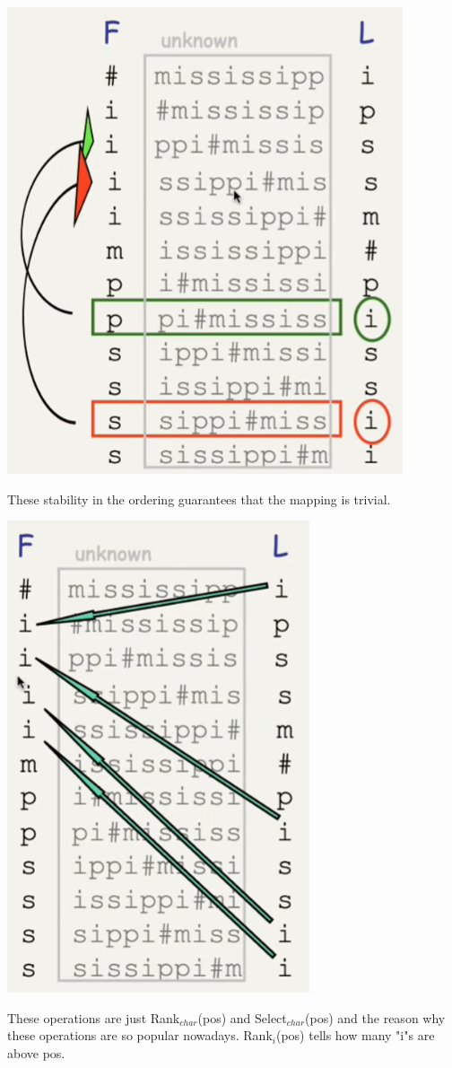 \documentclass[10pt]{report}
\begin{document}
\begin{center}
	\includegraphics[scale=0.5]{22.png}
\end{center}
These stability in the ordering guarantees that the mapping is trivial.
\begin{center}
	\includegraphics[scale=0.5]{23.png}
\end{center}
These operations are just Rank$_{char}$(pos) and Select$_{char}$(pos) and the reason why these operations are so popular nowadays. Rank$_i$(pos) tells how many "i"s are above pos.
\end{document}
